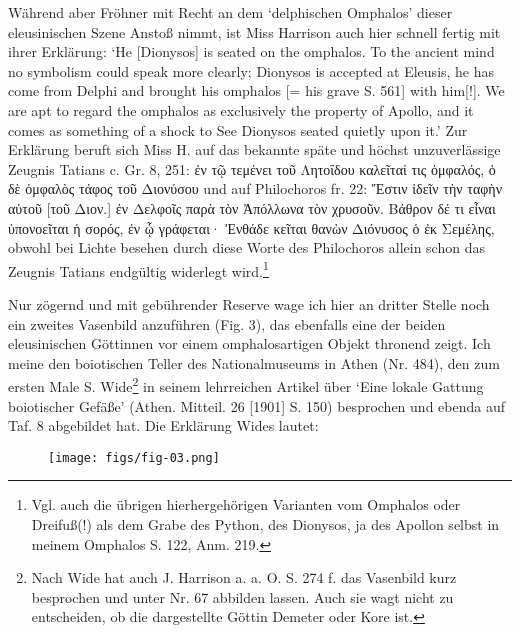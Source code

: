 \documentclass[a4paper, 11pt, oneside]{article}
\begin{document}
Während aber Fröhner mit Recht an dem `delphischen Omphalos' dieser eleusinischen Szene Anstoß nimmt, ist Miss Harrison auch hier schnell fertig mit ihrer Erklärung: `He [Dionysos] is seated on the omphalos. To the ancient mind no symbolism could speak more clearly; Dionysos is accepted at Eleusis, he has come from Delphi and brought his omphalos [= his grave S. 561] with him[!]. We are apt to regard the omphalos as exclusively the property of Apollo, and it comes as something of a shock to See Dionysos seated quietly upon it.' Zur Erklärung beruft sich Miss H. auf das bekannte späte und höchst unzuverlässige Zeugnis Tatians c. Gr. 8, 251: ἐν τῷ τεμένει τοῦ Λητοΐδου καλεῖταί τις ὀμφαλός, ὁ δὲ ὀμφαλὸς τάφος τοῦ Διονύσου und auf Philochoros fr. 22: Ἔστιν ἰδεῖν τὴν ταφὴν αὐτοῦ [τοῦ Διον.] ἐν Δελφοῖς παρὰ τὸν Ἀπόλλωνα τὸν χρυσοῦν. Βάθρον δέ τι εἶναι ὑπονοεῖται ἡ σορός, ἐν ᾧ γράφεται· Ἐνθάδε κεῖται θανὼν Διόνυσος ὁ ἐκ Σεμέλης, obwohl bei Lichte besehen durch diese Worte des Philochoros allein schon das Zeugnis Tatians endgültig widerlegt wird.\footnote{Vgl. auch die übrigen hierhergehörigen Varianten vom Omphalos oder Dreifuß(!) als dem Grabe des Python, des Dionysos, ja des Apollon selbst in meinem Omphalos S. 122, Anm. 219.}

Nur zögernd und mit gebührender Reserve wage ich hier an dritter Stelle noch ein zweites Vasenbild anzuführen (Fig. 3), das ebenfalls eine der beiden eleusinischen Göttinnen vor einem omphalosartigen Objekt thronend zeigt. Ich meine den boiotischen Teller des Nationalmuseums in Athen (Nr. 484), den zum ersten Male S. Wide\footnote{Nach Wide hat auch J. Harrison a. a. O. S. 274 f. das Vasenbild kurz besprochen und unter Nr. 67 abbilden lassen. Auch sie wagt nicht zu entscheiden, ob die dargestellte Göttin Demeter oder Kore ist.} in seinem lehrreichen Artikel über `Eine lokale Gattung boiotischer Gefäße' (Athen. Mitteil. 26 [1901] S. 150) besprochen und ebenda auf Taf. 8 abgebildet hat. Die Erklärung Wides lautet:

\begin{figure}[H]
\centering
\texttt{[image: figs/fig-03.png]}
\caption{}
\end{figure}
\end{document}
